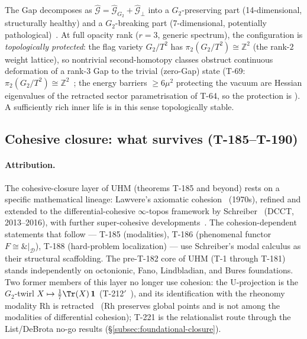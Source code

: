 The Gap decomposes as $\hat{\mathcal{G}} = \hat{\mathcal{G}}_{G_2} +
\hat{\mathcal{G}}_\perp$ into a $G_2$-preserving part (14-dimensional, structurally
healthy) and a $G_2$-breaking part (7-dimensional, potentially pathological)~.
At full opacity rank ($r = 3$, generic spectrum), the configuration is
\emph{topologically protected}: the flag variety $G_2/T^2$ has
$\pi_2(G_2/T^2) \cong \mathbb{Z}^2$ (the rank-$2$ weight lattice), so nontrivial
second-homotopy classes obstruct continuous deformation of a rank-$3$ Gap to the
trivial (zero-Gap) state (T-69: $\pi_2(G_2/T^2) \cong \mathbb{Z}^2$~; the
energy barriers $\geq 6\mu^2$ protecting the vacuum are Hessian eigenvalues of the
retracted sector parametrisation of T-64, so the protection is ).
A sufficiently rich inner life is in this sense topologically stable.

\subsection{Cohesive closure: what survives (T-185--T-190)}
\label{subsec:cohesive-closure}

\paragraph{Attribution.} The cohesive-closure layer of UHM (theorems T-185 and beyond)
rests on a specific mathematical lineage: Lawvere's axiomatic cohesion~\cite{lawvere1973}
(1970s), refined and extended to the differential-cohesive $\infty$-topos framework by
Schreiber~\cite{schreiber2013} (DCCT, 2013--2016), with further super-cohesive
developments~\cite{sati-schreiber2018}. The cohesion-dependent statements that follow
--- T-185 (modalities), T-186 (phenomenal functor $F \cong \&|_{\mathcal D}$), T-188
(hard-problem localization) --- use Schreiber's modal calculus as their structural
scaffolding. The pre-T-182 core of UHM (T-1 through T-181) stands independently on
octonionic, Fano, Lindbladian, and Bures foundations. Two former members of this layer
no longer use cohesion: the U-projection is the $G_2$-twirl
$X \mapsto \tfrac17\Tr(X)\,\mathbf 1$ (T-212$'$~), and its identification with
the rheonomy modality $\mathrm{Rh}$ is retracted~\status{$\times$} ($\mathrm{Rh}$ preserves
global points and is not among the modalities of differential cohesion); T-221 is the
relationalist route through the List/DeBrota no-go results (\S\ref{subsec:foundational-closure}).

